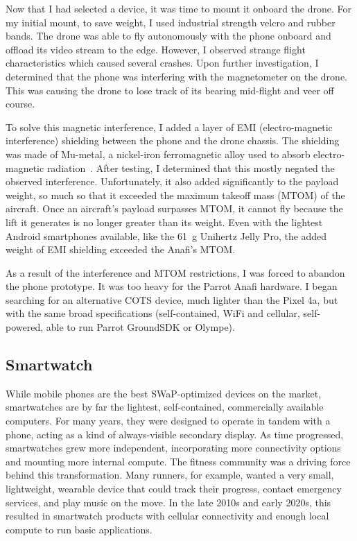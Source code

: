 Now that I had selected a device, it was time to mount it onboard the drone. For my initial mount, to save weight, I used industrial strength velcro and rubber bands. The drone was able to fly autonomously with the phone onboard and offload its video stream to the edge. However, I observed strange flight characteristics which caused several crashes. Upon further investigation, I determined that the phone was interfering with the magnetometer on the drone. This was causing the drone to lose track of its bearing mid-flight and veer off course.

To solve this magnetic interference, I added a layer of EMI  (electro-magnetic interference) shielding between the phone and the drone chassis. The shielding was made of Mu-metal, a nickel-iron ferromagnetic alloy used to absorb electro-magnetic radiation~\cite{Orasugh2023}. After testing, I determined that this mostly negated the observed interference. Unfortunately, it also added significantly to the payload weight, so much so that it exceeded the maximum takeoff mass (MTOM) of the aircraft. Once an aircraft's payload surpasses MTOM, it cannot fly because the lift it generates is no longer greater than its weight. Even with the lightest Android smartphones available, like the 61~g Unihertz Jelly Pro, the added weight of EMI shielding exceeded the Anafi's MTOM. 

As a result of the interference and MTOM restrictions, I was forced to abandon the phone prototype. It was too heavy for the Parrot Anafi hardware. I began searching for an alternative COTS device, much lighter than the Pixel 4a, but with the same broad specifications (self-contained, WiFi and cellular, self-powered, able to run Parrot GroundSDK or Olympe). 

\subsection{Smartwatch}
While mobile phones are the best SWaP-optimized devices on the market, smartwatches are by far the lightest, self-contained, commercially available computers. For many years, they were designed to operate in tandem with a phone, acting as a kind of always-visible secondary display. As time progressed, smartwatches grew more independent, incorporating more connectivity options and mounting more internal compute. The fitness community was a driving force behind this transformation. Many runners, for example, wanted a very small, lightweight, wearable device that could track their progress, contact emergency services, and play music on the move. In the late 2010s and early 2020s, this resulted in smartwatch products with cellular connectivity and enough local compute to run basic applications.


